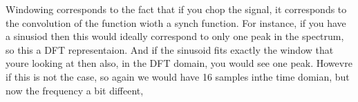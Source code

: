 Windowing corresponds to the fact that if you chop the signal, it corresponds to the convolution of the function wioth a synch function. For instance, if you have a sinusiod then this would ideally correspond to only one peak in the spectrum, so this  a DFT representaion.  And if the sinusoid fits exactly the window that  youre looking at then also, in the DFT domain, you would see one peak.  Howevre if this is not the case, so again we would have 16 samples inthe time domian, but now the frequency a bit diffeent,